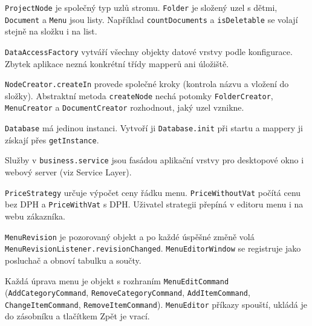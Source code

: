 \begin{description}[itemsep=2pt,style=unboxed]
  \item[Composite] \texttt{ProjectNode} je společný typ uzlů stromu. \texttt{Folder} je složený uzel s dětmi, \texttt{Document} a \texttt{Menu} jsou listy. Například \texttt{countDocuments} a \texttt{isDeletable} se volají stejně na složku i na list.
  \item[Factory] \texttt{DataAccessFactory} vytváří všechny objekty datové vrstvy podle konfigurace. Zbytek aplikace nezná konkrétní třídy mapperů ani úložiště.
  \item[Factory Method] \texttt{NodeCreator.createIn} provede společné kroky (kontrola názvu a vložení do složky). Abstraktní metoda \texttt{createNode} nechá potomky \texttt{FolderCreator}, \texttt{MenuCreator} a \texttt{DocumentCreator} rozhodnout, jaký uzel vznikne.
  \item[Singleton] \texttt{Database} má jedinou instanci. Vytvoří ji \texttt{Database.init} při startu a mappery ji získají přes \texttt{getInstance}.
  \item[Facade] Služby v \texttt{business.service} jsou fasádou aplikační vrstvy pro desktopové okno i webový server (viz Service Layer).
  \item[Strategy] \texttt{PriceStrategy} určuje výpočet ceny řádku menu. \texttt{PriceWithoutVat} počítá cenu bez DPH a \texttt{PriceWithVat} s DPH. Uživatel strategii přepíná v editoru menu i na webu zákazníka.
  \item[Observer] \texttt{MenuRevision} je pozorovaný objekt a po každé úspěšné změně volá \texttt{MenuRevisionListener.revisionChanged}. \texttt{MenuEditorWindow} se registruje jako posluchač a obnoví tabulku a součty.
  \item[Command] Každá úprava menu je objekt s rozhraním \texttt{MenuEditCommand} (\texttt{AddCategoryCommand}, \texttt{RemoveCategoryCommand}, \texttt{AddItemCommand}, \texttt{ChangeItemCommand}, \texttt{RemoveItemCommand}). \texttt{MenuEditor} příkazy spouští, ukládá je do zásobníku a tlačítkem Zpět je vrací.
\end{description}
\endgroup
